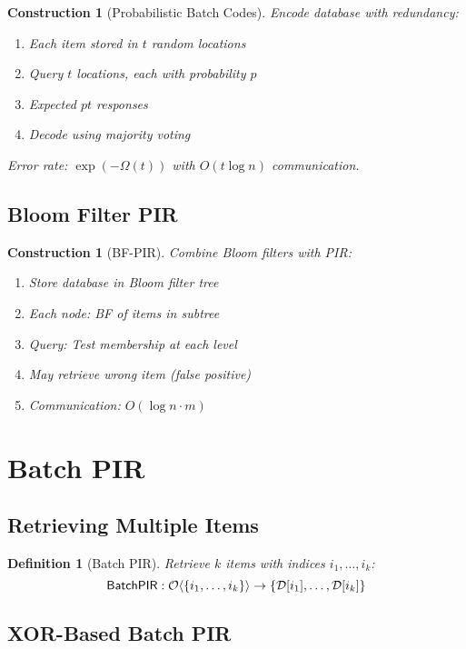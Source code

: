 \documentclass[11pt,final]{article}
\newcommand{\DB}{\mathcal{D}}
\newtheorem{definition}[theorem]{Definition}
\newtheorem{construction}[theorem]{Construction}
\begin{document}
\begin{construction}[Probabilistic Batch Codes]
Encode database with redundancy:
\begin{enumerate}
    \item Each item stored in $t$ random locations
    \item Query $t$ locations, each with probability $p$
    \item Expected $pt$ responses
    \item Decode using majority voting
\end{enumerate}
Error rate: $\exp(-\Omega(t))$ with $O(t \log n)$ communication.
\end{construction}

\subsection{Bloom Filter PIR}

\begin{construction}[BF-PIR]
Combine Bloom filters with PIR:
\begin{enumerate}
    \item Store database in Bloom filter tree
    \item Each node: BF of items in subtree
    \item Query: Test membership at each level
    \item May retrieve wrong item (false positive)
    \item Communication: $O(\log n \cdot m)$
\end{enumerate}
\end{construction}

\section{Batch PIR}

\subsection{Retrieving Multiple Items}

\begin{definition}[Batch PIR]
Retrieve $k$ items with indices $i_1, \ldots, i_k$:
\begin{equation}
\mathsf{BatchPIR}: \Obv{\{i_1, \ldots, i_k\}} \to \{\DB[i_1], \ldots, \DB[i_k]\}
\end{equation}
\end{definition}

\subsection{XOR-Based Batch PIR}
\end{document}
